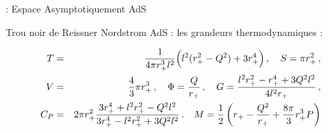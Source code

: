 

\begin{frame}{\underline{\secname} : Espace Asymptotiquement AdS}
\begin{block}{Trou noir de Reissner Nordstrom AdS :}
	les grandeurs thermodynamiques :
	
	\begin{eqnarray*}
T&=&\frac{1}{4\pi r_+^3 l^2}\Bigl(l^2(r_+^2-Q^2)+3r_+^4\Bigr)\,,\quad S=\pi r_+^2\,,\nonumber\\
V&=&\frac{4}{3}\pi r_+^3\,,\quad \Phi=\frac{Q}{r_+}\,,\quad 
G=\frac{l^2r_+^2-r_+^4+3Q^2l^2}{4l^2r_+}\,,\nonumber\\
C_P&=&2\pi r_+^2\frac{3r_+^4+l^2r_+^2-Q^2l^2}{3r_+^4-l^2r_+^2+3Q^2l^2}\,.\quad M= \frac{1}{2}\left(r_{+}-\frac{Q^{2}}{r_{+}}+\frac{8 \pi}{3} r_{+}^{3} P\right)
	\end{eqnarray*}


	
\end{block}

\end{frame}



